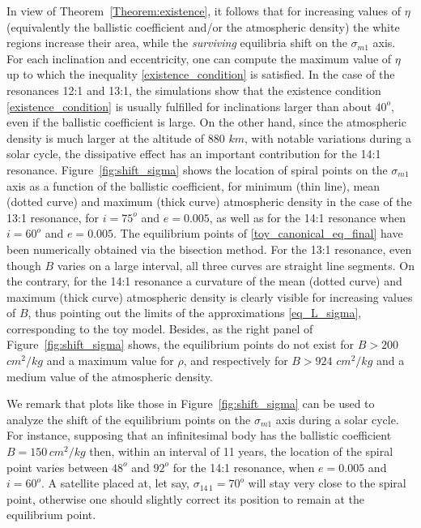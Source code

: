 \documentclass[12pt,reqno]{amsart}
\numberwithin{equation}{section}
\begin{document}
In view of Theorem~\ref{Theorem:existence}, it follows that for increasing values of $\eta$ (equivalently the ballistic coefficient and/or the atmospheric density) the white regions increase their area, while the {\it surviving} equilibria shift on the $\sigma_{m1}$ axis. For each inclination and eccentricity, one can compute the maximum value of $\eta$ up to which the inequality \eqref{existence_condition} is satisfied. In the case of
the resonances 12:1 and 13:1, the simulations show that the existence condition \eqref{existence_condition} is usually fulfilled for inclinations larger than about $40^o$, even if the ballistic coefficient is large.
On the other hand, since the atmospheric density is much larger at the altitude of 880 $km$, with notable variations during a solar cycle, the dissipative effect has an important contribution for the 14:1 resonance.
Figure~\ref{fig:shift_sigma} shows the location of spiral points on the $\sigma_{m1}$ axis as a function of the ballistic coefficient, for minimum (thin line), mean (dotted curve) and maximum (thick curve) atmospheric density in the case of
the 13:1 resonance, for $i=75^o$ and $e=0.005$, as well as for the 14:1 resonance when $i=60^o$ and $e=0.005$.
The equilibrium points of \eqref{toy_canonical_eq_final} have been numerically obtained via the
bisection method.
For the 13:1 resonance, even though $B$ varies on a large interval, all three curves are straight line segments.
On the contrary, for the 14:1 resonance a curvature of the mean (dotted curve) and maximum (thick curve)
atmospheric density is clearly visible for increasing values of $B$,  thus pointing out the
limits of the approximations \eqref{eq_L_sigma}, corresponding to the toy model.
Besides, as the right panel of Figure~\ref{fig:shift_sigma} shows, the equilibrium points do not exist
for $B>200$ $cm^2/kg$ and a maximum value for $\rho$, and respectively for $B>924$ $cm^2/kg$
and a medium value of the atmospheric density.

We remark that plots like those in Figure~\ref{fig:shift_sigma} can be used to analyze the shift of the equilibrium points
on the $\sigma_{m 1}$ axis during a solar cycle. For instance, supposing that an infinitesimal body has the
ballistic coefficient $B=150\, cm^2/kg$ then, within an interval of 11 years, the location of the spiral point
varies between $48^o$ and $92^o$ for the 14:1 resonance, when $e=0.005$ and $i=60^o$.
A satellite placed at, let say, $\sigma_{1\!4 \,  1}=70^o$ will stay very close to the spiral point,
otherwise one should slightly correct its position to remain at the equilibrium point.
\end{document}

